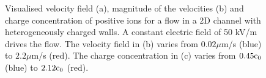 \begin{figure}
  \centering
  \hspace{5pt}   
\hspace{5pt} 
  \caption{Visualised velocity field (a), magnitude of the velocities
    (b) and charge concentration of positive ions for a flow in a 2D
    channel with heterogeneously charged walls. A constant electric
    field of 50 kV/m drives the flow. The velocity field in
    (b) varies from $0.02 \mu$m/s (blue) to $2.2 \mu$m/s (red). The
    charge concentration in (c) varies from $0.45\mathrm{c}_0 $ (blue) to
    $2.12\mathrm{c}_0$ (red).}
  \label{fig:res:hetro}
\end{figure}

